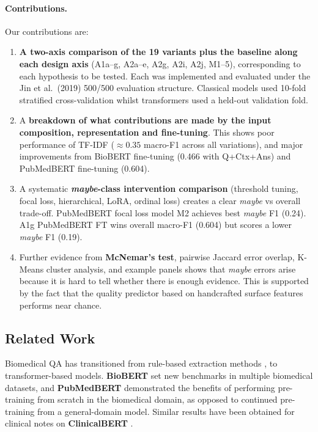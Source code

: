 \documentclass[11pt]{article}
\begin{document}
\paragraph{Contributions.} Our contributions are:
\begin{enumerate}
\item \textbf{A two-axis comparison of the 19 variants plus the baseline along each design axis} (A1a--g, A2a--e, A2g, A2i, A2j, M1--5), corresponding to each hypothesis to be tested. Each was implemented and evaluated under the Jin et al.\ (2019) 500/500 evaluation structure. Classical models used 10-fold stratified cross-validation whilst transformers used a held-out validation fold.
\item A \textbf{breakdown of what contributions are made by the input composition, representation and fine-tuning}. This shows poor performance of TF-IDF ($\approx 0.35$ macro-F1 across all variations), and major improvements from BioBERT fine-tuning (0.466 with Q+Ctx+Ans) and PubMedBERT fine-tuning (0.604).
\item A systematic \textbf{\textit{maybe}-class intervention comparison} (threshold tuning, focal loss, hierarchical, LoRA, ordinal loss) creates a clear \textit{maybe} vs overall trade-off. PubMedBERT focal loss model M2 achieves best \textit{maybe} F1 (0.24). A1g PubMedBERT FT wins overall macro-F1 (0.604) but scores a lower \textit{maybe} F1 (0.19).
\item Further evidence from \textbf{McNemar's test}, pairwise Jaccard error overlap, K-Means cluster analysis, and example panels shows that \textit{maybe} errors arise because it is hard to tell whether there is enough evidence. This is supported by the fact that the quality predictor based on handcrafted surface features performs near chance.
\end{enumerate}

\subsection{Related Work}

Biomedical QA has transitioned from rule-based extraction methods \cite{paliouras2013bioasq}, to transformer-based models. \textbf{BioBERT} \cite{lee2020biobert} set new benchmarks in multiple biomedical datasets, and \textbf{PubMedBERT} \cite{gu2021domainspecific} demonstrated the benefits of performing pre-training from scratch in the biomedical domain, as opposed to continued pre-training from a general-domain model. Similar results have been obtained for clinical notes on \textbf{ClinicalBERT} \cite{huang2020clinicalbert}.
\end{document}

